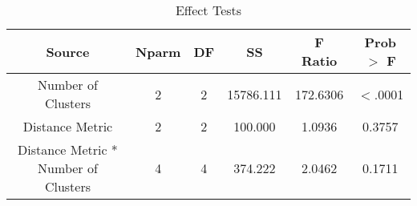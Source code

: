\documentclass[times]{article}
\begin{document}
   \begin{table}[H]
      \centering
      \caption{Effect Tests}
      \label{tab:effect}
      \begin{tabular}{| c | c | c | c | c | c |}
         \hline
         Source & 
            Nparm & DF &        SS & F Ratio  & Prob $>$ F \\
         \hline
         Number of Clusters &
            2     & 2  & 15786.111 & 172.6306 & $<$.0001 \\
         \hline
         Distance Metric &
            2     & 2  &   100.000 &   1.0936 & 0.3757 \\
         \hline
         Distance Metric * Number of Clusters &
            4     & 4  &   374.222 &   2.0462 & 0.1711 \\
         \hline
      \end{tabular}
   \end{table}
\end{document}
